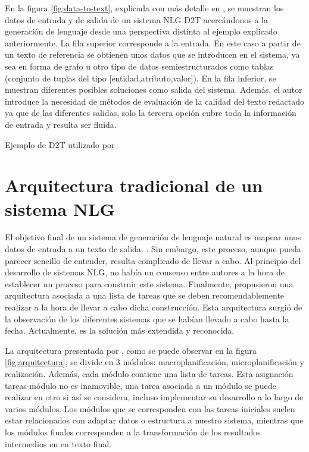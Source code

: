 En la figura \ref{fig:data-to-text}, explicada con más detalle en \cite{sai2020survey}, se muestran los datos de entrada y de salida de un sistema NLG D2T acercándonos a la generación de lenguaje desde una perspectiva distinta al ejemplo explicado anteriormente. La fila superior corresponde a la entrada. En este caso a partir de un texto de referencia se obtienen unos datos que se introducen en el sistema, ya sea en forma de grafo u otro tipo de datos semiestructurados como tablas (conjunto de tuplas del tipo [entidad,atributo,valor]). En la fila inferior, se muestran diferentes posibles soluciones como salida del sistema. Además, el autor introduce la necesidad de métodos de evaluación de la calidad del texto redactado ya que de las diferentes salidas, solo la tercera opción cubre toda la información de entrada y resulta ser fluida.

%
{Ejemplo de D2T utilizado por \cite{sai2020survey}}

\section{Arquitectura tradicional de un sistema NLG}
\label{sec:arquitectura_tradicional}
El objetivo final de un sistema de generación de lenguaje natural es mapear unos datos de entrada a un texto de salida. \citep{reiter1997building}. Sin embargo, este proceso, aunque pueda parecer sencillo de entender, resulta complicado de llevar a cabo. Al principio del desarrollo de sistemas NLG, no había un consenso entre autores a la hora de establecer un proceso para construir este sistema. Finalmente, \cite{reiter1997building} propusieron una arquitectura asociada a una lista de tareas que se deben recomendablemente realizar a la hora de llevar a cabo dicha construcción. Esta arquitectura surgió de la observación de los diferentes sistemas que se habían llevado a cabo hasta la fecha.  Actualmente, es la solución más extendida y reconocida.

La arquitectura presentada por \cite{reiter1997building}, como se puede observar en la figura \ref{fig:arquitectura}, se divide en 3 módulos: macroplanificación, microplanificación y realización. Además, cada módulo contiene una lista de tareas. Esta asignación tareas-módulo no es inamovible, una tarea asociada a un módulo se puede realizar en otro si así se considera, incluso implementar su desarrollo a lo largo de varios módulos. Los módulos que se corresponden con las tareas iniciales suelen estar relacionados con adaptar datos o estructura a nuestro sistema, mientras que los módulos finales corresponden a la transformación de los resultados intermedios en en texto final.

